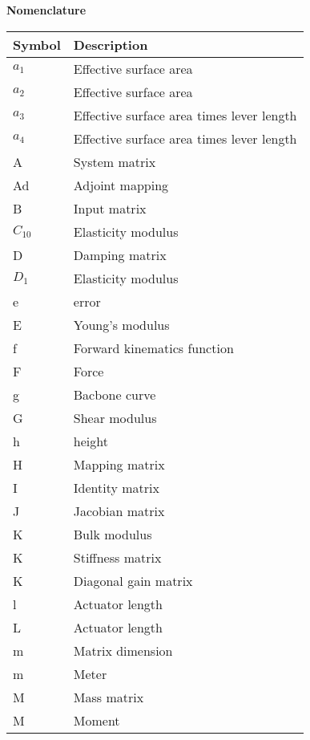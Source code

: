 \begin{spacing}{0.9}

\Large{\textbf{Nomenclature}}

\begin{multicols}{2}
\begin{table}[H]
\centering
    \begin{tabular}{p{1.5cm} p{5cm}} \hline
    \textbf{Symbol}    &   \textbf{Description }\\ \hline
    $a_1$     &  Effective surface area \\
    $a_2$     &  Effective surface area \\
    $a_3$     &  Effective surface area times lever length \\
    $a_4$     &  Effective surface area times lever length \\
    A      &  System matrix \\
    Ad     &  Adjoint mapping \\
    B     &  Input matrix \\
    $C_{10}$     &  Elasticity modulus \\
    D     &  Damping matrix \\
    $D_1$     &  Elasticity modulus \\
    e     & error \\
    E     &  Young's modulus \\
    f     & Forward kinematics function \\
    F     & Force \\
    g     &  Bacbone curve \\
    G     &  Shear modulus \\
    h     &  height \\
    H     &  Mapping matrix \\
    I     &  Identity matrix \\
    J     &  Jacobian matrix \\
    K     &  Bulk modulus \\
    K     &  Stiffness matrix \\
    K     &  Diagonal gain matrix \\
    l     &  Actuator length \\
    L     &  Actuator length \\
    m     &  Matrix dimension \\
    m     &  Meter \\
    M     &  Mass matrix \\
    M     &  Moment \\

\end{tabular}
\end{table}
\end{multicols}
\end{spacing}
